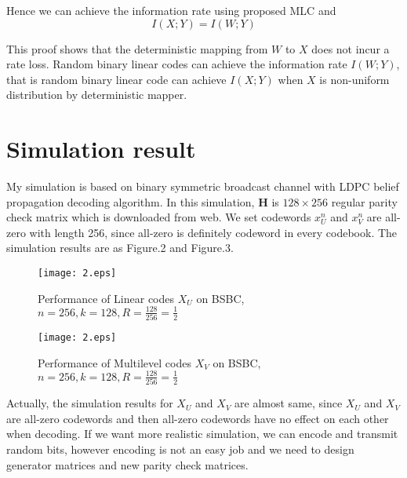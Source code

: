 \documentclass[12]{article}
\begin{document}
Hence we can achieve the information rate using proposed MLC and
\begin{equation*}
	I(X;Y)=I(W;Y)
\end{equation*}

This proof shows that the deterministic mapping from $W$ to $X$ does not
incur a rate loss. Random binary linear codes can achieve the information rate $I(W;Y)$, that is 
random binary linear code can achieve $I(X;Y)$ when $X$ is non-uniform distribution by
deterministic mapper.

\section*{Simulation result}
My simulation is based on binary symmetric broadcast channel with LDPC belief propagation decoding 
algorithm. In this simulation, $\mathbf{H}$ is $128\times256$
regular parity check matrix which is downloaded from web. We set codewords $x_U^n$ and $x_V^n$ are all-zero
with length 256, since all-zero is definitely codeword in every codebook. The simulation results are as Figure.2 and Figure.3.\\

  \begin{figure}
\centering
  \texttt{[image: 2.eps]}
 \caption{Performance of Linear codes $X_U$ on BSBC, $n=256, k=128, R=\frac{128}{256}=\frac{1}{2}$}
\label{2}
\end{figure}
  \begin{figure}
\centering
  \texttt{[image: 2.eps]}
 \caption{Performance of Multilevel codes $X_V$ on BSBC, $n=256, k=128, R=\frac{128}{256}=\frac{1}{2}$}
\label{3}
\end{figure}

Actually, the simulation results for $X_U$ and $X_V$ are almost same, since $X_U$ and $X_V$ are all-zero
codewords and then all-zero codewords have no effect on each other when decoding. If we want more realistic simulation,
we can encode and transmit random bits, however encoding is not an easy job
 and we need to design generator matrices and new parity check matrices.
 
\end{document}
